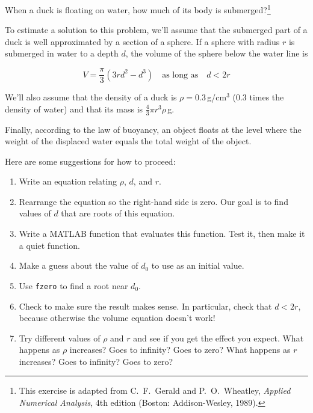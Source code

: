 \begin{ex}
\label{ex:duck}

When a duck is floating on water, how much of its body is submerged?\footnote{This exercise is adapted from C.~F.~Gerald and P.~O.~Wheatley, \emph{Applied Numerical Analysis}, 4th edition (Boston: Addison-Wesley, 1989).}


To estimate a solution to this problem, we'll assume that the submerged part of a duck is well approximated by a section of a sphere.
If a sphere with radius $r$ is submerged in water to a depth $d$, the
volume of the sphere below the water line is

\[ V = \frac{\pi}{3} (3r d^2 - d^3) \quad
\mbox{as long as} \quad d < 2 r  \]

We'll also assume that the density of a duck is $\rho = 0.3$\,g/cm$^3$ (0.3 times the density of water) and that its mass is $\frac{4}{3} \pi r^3 \rho$\,g.

Finally, according to the law of buoyancy, an object floats at the level where the weight of the displaced water equals the total weight of the object.


Here are some suggestions for how to proceed:

\begin{enumerate}

\item Write an equation relating $\rho$, $d$, and $r$.

\item Rearrange the equation so the right-hand side is zero.
Our goal is to find values of $d$ that are roots of this equation.

\item Write a MATLAB function that evaluates this function.  Test it,
   then make it a quiet function.

\item Make a guess about the value of $d_0$ to use as an initial value.

\item Use \lstinline{fzero} to find a root near $d_0$.

\item Check to make sure the result makes sense.  In particular,
   check that $d < 2 r$, because otherwise the volume equation
   doesn't work!

\item Try different values of $\rho$ and $r$ and see if you get the
  effect you expect.  What happens as $\rho$ increases?  Goes to
  infinity?  Goes to zero?  What happens as $r$ increases?  Goes to
  infinity?  Goes to zero?

\end{enumerate}




\end{ex}
